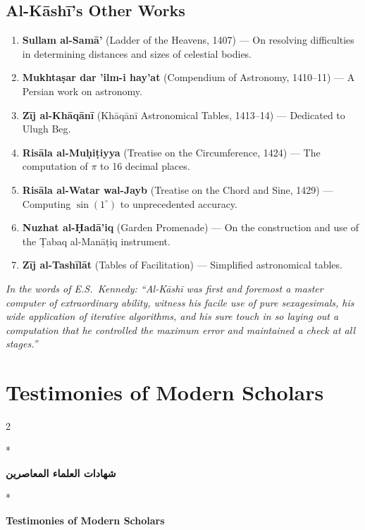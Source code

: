 \documentclass[11pt,a4paper]{article}
\newcommand{\cnote}[1]{\textcolor{notecolor}{\textit{#1}}}
\newcommand{\ar}[1]{\arabicfont\beginR #1\endR}
\newenvironment{bilingual}{%
  \vspace{0.3em}%
  \begin{paracol}{2}%
}{%
  \end{paracol}%
  \vspace{0.3em}%
}
\begin{document}
\subsection{Al-K\=ash\=i's Other Works}

\begin{enumerate}[label=\arabic*.]
  \item \textbf{Sullam al-Sam\=a'} (Ladder of the Heavens, 1407) --- On
  resolving difficulties in determining distances and sizes of celestial
  bodies.
  \item \textbf{Mukhta\d{s}ar dar 'ilm-i hay'at} (Compendium of Astronomy,
  1410--11) --- A Persian work on astronomy.
  \item \textbf{Z\=ij al-Kh\=aq\=an\=i} (Kh\=aq\=an\=i Astronomical Tables,
  1413--14) --- Dedicated to Ulugh Beg.
  \item \textbf{Ris\=ala al-Mu\d{h}i\d{t}iyya} (Treatise on the Circumference,
  1424) --- The computation of $\pi$ to 16 decimal places.
  \item \textbf{Ris\=ala al-Watar wal-Jayb} (Treatise on the Chord and
  Sine, 1429) --- Computing $\sin(1^\circ)$ to unprecedented accuracy.
  \item \textbf{Nuzhat al-\d{H}ad\=a'iq} (Garden Promenade) --- On the
  construction and use of the \d{T}abaq al-Man\=a\d{t}iq instrument.
  \item \textbf{Z\=ij al-Tash\=il\=at} (Tables of Facilitation) ---
  Simplified astronomical tables.
\end{enumerate}

\cnote{In the words of E.S.\ Kennedy: ``Al-K\=ash\=i was first and foremost
a master computer of extraordinary ability, witness his facile use of
pure sexagesimals, his wide application of iterative algorithms, and his
sure touch in so laying out a computation that he controlled the maximum error
and maintained a check at all stages.''}
\clearpage

\section{Testimonies of Modern Scholars}
\label{app:scholars}

\begin{bilingual}
\switchcolumn[0]*
\begin{center}
\textbf{\Large\color{chapcolor}\ar{شهادات العلماء المعاصرين}}
\end{center}
\switchcolumn[1]*
\begin{center}
\textbf{\Large\color{chapcolor}Testimonies of Modern Scholars}
\end{center}
\end{bilingual}
\end{document}
